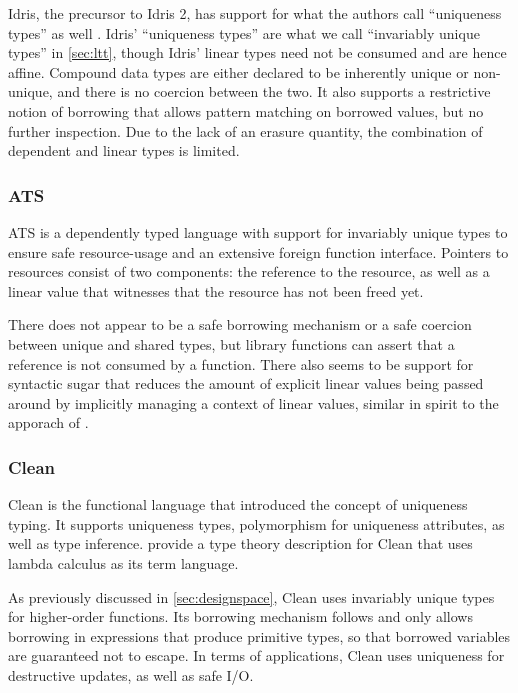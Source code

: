 Idris, the precursor to Idris 2, has support for what the authors call ``uniqueness types'' as well \citep{brady_type_2017}. Idris' ``uniqueness types'' are what we call ``invariably unique types'' in \cref{sec:ltt}, though Idris' linear types need not be consumed and are hence affine. Compound data types are either declared to be inherently unique or non-unique, and there is no coercion between the two. It also supports a restrictive notion of borrowing that allows pattern matching on borrowed values, but no further inspection. Due to the lack of an erasure quantity, the combination of dependent and linear types is limited.

\subsubsection{ATS}
ATS \citep{shi_linear_2013} is a dependently typed language with support for invariably unique types to ensure safe resource-usage and an extensive foreign function interface. Pointers to resources consist of two components: the reference to the resource, as well as a linear value that witnesses that the resource has not been freed yet. 

There does not appear to be a safe borrowing mechanism or a safe coercion between unique and shared types, but library functions can assert that a reference is not consumed by a function. There also seems to be support for syntactic sugar that reduces the amount of explicit linear values being passed around by implicitly managing a context of linear values, similar in spirit to the apporach of \cite{spiwack_linearly_2022}.

\subsubsection{Clean}
Clean \citep{smetsers_guaranteeing_1994} is the functional language that introduced the concept of uniqueness typing. It supports uniqueness types, polymorphism for uniqueness attributes, as well as type inference. \cite{vries_making_2009} provide a type theory description for Clean that uses lambda calculus as its term language. 

As previously discussed in \cref{sec:designspace}, Clean uses invariably unique types for higher-order functions. Its borrowing mechanism follows \cite{wadler_linear_1990} and only allows borrowing in expressions that produce primitive types, so that borrowed variables are guaranteed not to escape. In terms of applications, Clean uses uniqueness for destructive updates, as well as safe I/O.

